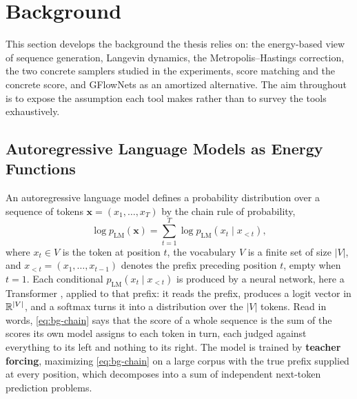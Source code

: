 \section{Background}
\label{ch:background}

This section develops the background the thesis relies on: the energy-based view of sequence generation, Langevin dynamics, the Metropolis--Hastings correction, the two concrete samplers studied in the experiments, score matching and the concrete score, and GFlowNets as an amortized alternative. The aim throughout is to expose the assumption each tool makes rather than to survey the tools exhaustively.

\subsection{Autoregressive Language Models as Energy Functions}
\label{sec:bg-ebm}

An autoregressive language model defines a probability distribution over a sequence of tokens $\bm{x} = (x_1, \dots, x_T)$ by the chain rule of probability,
\begin{equation}
    \log p_{\text{LM}}(\bm{x}) = \sum_{t=1}^{T} \log p_{\text{LM}}(x_t \mid x_{<t}),
    \label{eq:bg-chain}
\end{equation}
where $x_t \in V$ is the token at position $t$, the vocabulary $V$ is a finite set of size $|V|$, and $x_{<t} = (x_1, \dots, x_{t-1})$ denotes the prefix preceding position $t$, empty when $t = 1$. Each conditional $p_{\text{LM}}(x_t \mid x_{<t})$ is produced by a neural network, here a Transformer \citep{vaswani2017attention}, applied to that prefix: it reads the prefix, produces a logit vector in $\mathbb{R}^{|V|}$, and a softmax turns it into a distribution over the $|V|$ tokens. Read in words, \eqref{eq:bg-chain} says that the score of a whole sequence is the sum of the scores its own model assigns to each token in turn, each judged against everything to its left and nothing to its right. The model is trained by \textbf{teacher forcing}, maximizing \eqref{eq:bg-chain} on a large corpus with the true prefix supplied at every position, which decomposes into a sum of independent next-token prediction problems.

